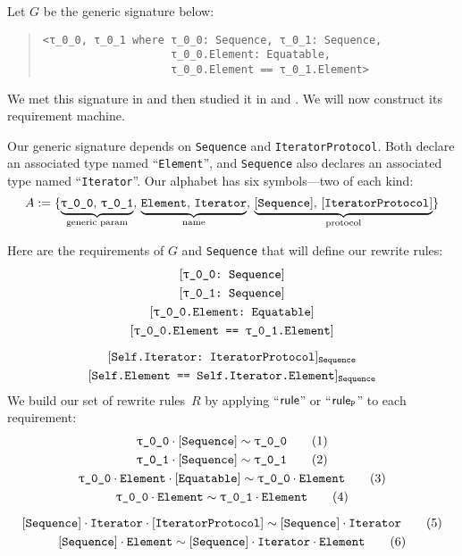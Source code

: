 \documentclass[../generics]{subfiles}
\begin{document}
\begin{example}\label{rqm first example}
Let $G$ be the generic signature below:
\begin{quote}
\begin{verbatim}
<τ_0_0, τ_0_1 where τ_0_0: Sequence, τ_0_1: Sequence,
                    τ_0_0.Element: Equatable,
                    τ_0_0.Element == τ_0_1.Element>
\end{verbatim}
\end{quote}
We met this signature in  and then studied it in  and . We will now construct its requirement machine.

Our generic signature depends on \texttt{Sequence} and \texttt{IteratorProtocol}. Both declare an associated type named ``\texttt{Element}'', and \texttt{Sequence} also declares an associated type named ``\texttt{Iterator}''. Our alphabet has six symbols---two of each kind:
\[ A := \{ \underbrace{\mathstrut\rT,\, \rU}_{\text{generic param}},\, \underbrace{\mathstrut\nElement,\, \nIterator}_{\text{name}},\, \underbrace{\mathstrut\pSequence,\, \pIterator}_{\text{protocol}} \} \]

Here are the requirements of $G$ and \texttt{Sequence} that will define our rewrite rules:
\begin{gather*}
\ConfReq{\rT}{Sequence}\\
\ConfReq{\rU}{Sequence}\\
\ConfReq{\rT.Element}{Equatable}\\
\SameReq{\rT.Element}{\rU.Element}\\[\medskipamount]
\AssocConfReq{Self.Iterator}{IteratorProtocol}{Sequence}\\
\AssocSameReq{Self.Element}{Self.Iterator.Element}{Sequence}
\end{gather*}
We build our set of rewrite rules~$R$ by applying ``$\mathsf{rule}$'' or ``$\mathsf{rule}_{\texttt{P}}$'' to each requirement:
\begin{gather*}
\ConfRule{\rT}{\pSequence} \tag{1} \\
\ConfRule{\rU}{\pSequence} \tag{2} \\
\ConfRule{\rT\cdot\nElement}{\protosym{Equatable}} \tag{3} \\
\SameRule{\rT\cdot\nElement}{\rU\cdot\nElement}\tag{4} \\[\medskipamount]
\ConfRule{\pSequence\cdot\nIterator}{\pIterator} \tag{5} \\
\SameRule{\pSequence\cdot\nElement}{\pSequence\cdot\nIterator\cdot\nElement} \tag{6}
\end{gather*}


\end{example}
\end{document}
